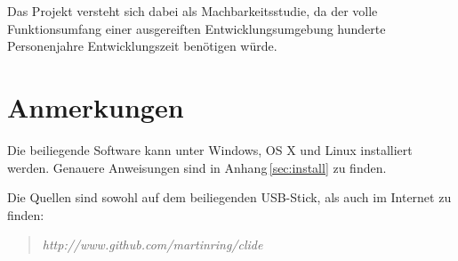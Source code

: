 Das Projekt versteht sich dabei als Machbarkeitsstudie, da der volle Funktionsumfang einer
ausgereiften Entwicklungsumgebung hunderte Personenjahre Entwicklungszeit benötigen würde.

\section{Anmerkungen}

Die beiliegende Software kann unter Windows, OS X und Linux installiert werden. Genauere
Anweisungen sind in Anhang\,\ref{sec:install} zu finden.

Die Quellen sind sowohl auf dem beiliegenden USB-Stick, als auch im Internet zu finden:

\begin{quote}
\textit{http://www.github.com/martinring/clide}
\end{quote}